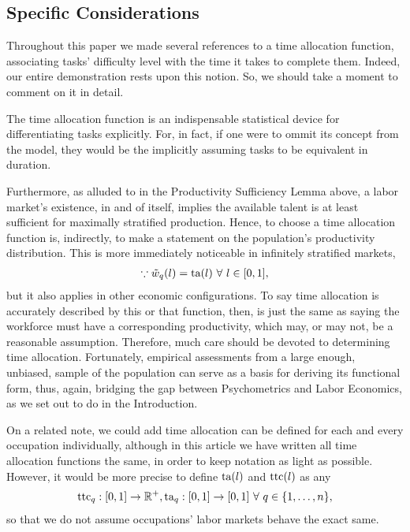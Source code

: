\documentclass[hidelinks, nonatbib]{elsarticle}
\begin{document}
\subsection{Specific Considerations}
Throughout this paper we made several references to a time allocation function, associating tasks' difficulty level with the time it takes to complete them. Indeed, our entire demonstration rests upon this notion. So, we should take a moment to comment on it in detail.

The time allocation function is an indispensable statistical device for differentiating tasks explicitly. For, in fact, if one were to ommit its concept from the model, they would be the implicitly assuming tasks to be equivalent in duration.

Furthermore, as alluded to in the Productivity Sufficiency Lemma above, a labor market's existence, in and of itself, implies the available talent is at least sufficient for maximally stratified production. Hence, to choose a time allocation function is, indirectly, to make a statement on the population's productivity distribution. This is more immediately noticeable in infinitely stratified markets,
\begin{gather}
    \because
    \tilde{w}_q(l)
    =
    \text{ta}(l)
    \
    \forall
    \
    l
    \in
    [0,1]
    ,
\end{gather}
but it also applies in other economic configurations. To say time allocation is accurately described by this or that function, then, is just the same as saying the workforce must have a corresponding productivity, which may, or may not, be a reasonable assumption. Therefore, much care should be devoted to determining time allocation. Fortunately, empirical assessments from a large enough, unbiased, sample of the population can serve as a basis for deriving its functional form, thus, again, bridging the gap between Psychometrics and Labor Economics, as we set out to do in the Introduction.

On a related note, we could add time allocation can be defined for each and every occupation individually, although in this article we have written all time allocation functions the same, in order to keep notation as light as possible. However, it would be more precise to define $\text{ta}(l)$ and $\text{ttc}(l)$ as any
\begin{gather}
    \text{ttc}_{q} : [0,1] \rightarrow \mathbb{R}^{+}
    ,
    \text{ta}_{q} : [0,1] \rightarrow [0,1]
    \
    \forall
    \
    q \in \{1, \dots, n\}
    ,
\end{gather}
so that we do not assume occupations' labor markets behave the exact same.
\end{document}

